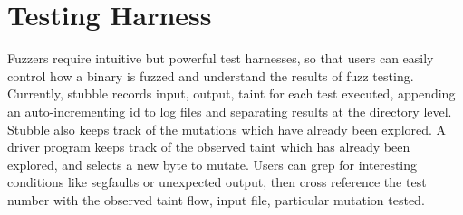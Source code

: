\documentclass[11pt,expanded,copyright]{fsuthesis}
\begin{document}
	
	
\section{Testing Harness}

Fuzzers require intuitive but powerful test harnesses, so that users can easily control how a binary is fuzzed and understand the results of fuzz testing. Currently, stubble records input, output, taint for each test executed, appending an auto-incrementing id to log files and separating results at the directory level. Stubble also keeps track of the mutations which have already been explored. A driver program keeps track of the observed taint which has already been explored, and selects a new byte to mutate. Users can grep for interesting conditions like segfaults or unexpected output, then cross reference the test number with the observed taint flow, input file, particular mutation tested.




\end{document}
